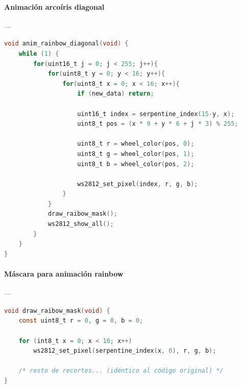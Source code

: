 \paragraph{Animación arcoíris diagonal}\label{anexo:WSrainbow}---\\
\begin{lstlisting}[language=C, caption={Animacion rainbow diagonal en matriz WS2812}]
void anim_rainbow_diagonal(void) {
    while (1) {
        for(uint16_t j = 0; j < 255; j++){
            for(uint8_t y = 0; y < 16; y++){
                for(uint8_t x = 0; x < 16; x++){
                    if (new_data) return;

                    uint16_t index = serpentine_index(15-y, x);
                    uint8_t pos = (x * 9 + y * 6 + j * 3) % 255;

                    uint8_t r = wheel_color(pos, 0);
                    uint8_t g = wheel_color(pos, 1);
                    uint8_t b = wheel_color(pos, 2);

                    ws2812_set_pixel(index, r, g, b);
                }
            }
            draw_raibow_mask();
            ws2812_show_all();
        }
    }
}
\end{lstlisting}


\paragraph{Máscara para animación rainbow}\label{anexo:WSmask}---\\
\begin{lstlisting}[language=C, caption={Funcion draw\_raibowmask()}]
void draw_raibow_mask(void) {
    const uint8_t r = 0, g = 0, b = 0;

    for (int8_t x = 0; x < 10; x++)
        ws2812_set_pixel(serpentine_index(x, 0), r, g, b);

    /* resto de recortes... (idéntico al código original) */
}
\end{lstlisting}


